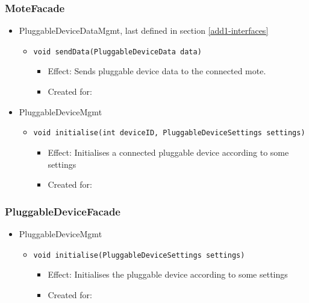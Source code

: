     \subsubsection{MoteFacade}
        \begin{itemize}
            \item PluggableDeviceDataMgmt, last defined in section \ref{add1-interfaces}
            \begin{itemize}
                \item \texttt{void sendData(PluggableDeviceData data)}
                \begin{itemize}
                    \item Effect: Sends pluggable device data to the connected mote.
                    \item Created for:
                \end{itemize}
            \end{itemize}

            \item PluggableDeviceMgmt
            \begin{itemize}
                \item \texttt{void initialise(int deviceID, PluggableDeviceSettings settings)}
                \begin{itemize}
                    \item Effect: Initialises a connected pluggable device according to some settings
                    \item Created for:
                \end{itemize}
            \end{itemize}
        \end{itemize}

    \subsubsection{PluggableDeviceFacade}
        \begin{itemize}
        	\item PluggableDeviceMgmt
        	\begin{itemize}
                \item \texttt{void initialise(PluggableDeviceSettings settings)}
                \begin{itemize}
                    \item Effect: Initialises the pluggable device according to some settings
                    \item Created for:
                \end{itemize}
        	\end{itemize}
        \end{itemize}

